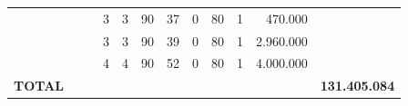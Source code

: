 \documentclass{article}
\begin{document}
\begin{longtable}[c]{m{6.5cm}|m{1pt}m{1pt}m{1pt}m{1pt}m{1pt}m{1pt}|m{1pt}m{1pt}m{0.5pt}m{1pt}|m{1pt}|m{1pt}m{1pt}|m{1pt}|m{2pt}}
& & & & & & & \multicolumn{1}{c}{ 3 } & \multicolumn{1}{c}{ 3 } & \multicolumn{1}{c}{ 90 } & \multicolumn{1}{c|}{ 37 } & \multicolumn{1}{c|}{ 0 } & \multicolumn{1}{l}{ 80 } & \multicolumn{1}{c|}{ 1 } & \multicolumn{1}{r|}{ 470.000 } & \\
& & & & & & & \multicolumn{1}{c}{ 3 } & \multicolumn{1}{c}{ 3 } & \multicolumn{1}{c}{ 90 } & \multicolumn{1}{c|}{ 39 } & \multicolumn{1}{c|}{ 0 } & \multicolumn{1}{l}{ 80 } & \multicolumn{1}{c|}{ 1 } & \multicolumn{1}{r|}{ 2.960.000 } & \\
& & & & & & & \multicolumn{1}{c}{ 4 } & \multicolumn{1}{c}{ 4 } & \multicolumn{1}{c}{ 90 } & \multicolumn{1}{c|}{ 52 } & \multicolumn{1}{c|}{ 0 } & \multicolumn{1}{l}{ 80 } & \multicolumn{1}{c|}{ 1 } & \multicolumn{1}{r|}{ 4.000.000 } & \\
\hline
\multicolumn{15}{C{6cm}|}{\textbf{ TOTAL }} & \multicolumn{1}{r}{\textbf{ 131.405.084 }} \\
\end{longtable}
\newpage
{}
{}
\renewcommand*{\arraystretch}{1.9}
\scriptsize
\color{myblack}
\centering
\end{document}
